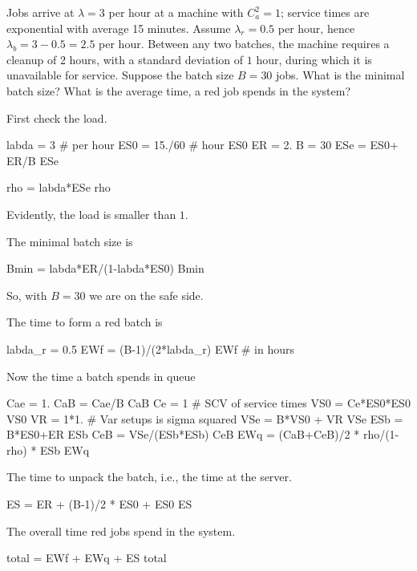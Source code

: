\begin{exercise}[\faPhoto]
  Jobs arrive at $\lambda=3$ per hour at a machine with $C_a^2=1$; service times are exponential with average 15 minutes.  Assume $\lambda_r = 0.5$ per hour, hence $\lambda_b = 3-0.5=2.5$ per hour. Between any two batches, the machine requires a cleanup of 2 hours, with a standard deviation of $1$ hour, during which it is unavailable for service.  Suppose the batch size $B=30$ jobs. What is the minimal batch size?  What is the average time, a red job spends in the system? 
  \begin{solution}
First check the load.
\begin{pyconsole}
labda = 3 # per hour
ES0 = 15./60 # hour
ES0
ER = 2.
B = 30
ESe = ES0+ ER/B
ESe

rho = labda*ESe
rho
\end{pyconsole}
Evidently, the load is smaller than $1$. 

The minimal batch size is
\begin{pyconsole}
Bmin = labda*ER/(1-labda*ES0)
Bmin
\end{pyconsole}
So, with $B=30$ we are on the safe side. 

The time to form a red batch is 
\begin{pyconsole}
labda_r = 0.5
EWf = (B-1)/(2*labda_r)
EWf # in hours
\end{pyconsole}

Now the time a batch spends in queue
\begin{pyconsole}
Cae = 1.
CaB = Cae/B
CaB
Ce = 1 # SCV of service times
VS0 = Ce*ES0*ES0
VS0
VR = 1*1. # Var setups is sigma squared
VSe = B*VS0 + VR
VSe
ESb = B*ES0+ER
ESb
CeB = VSe/(ESb*ESb)
CeB
EWq = (CaB+CeB)/2 * rho/(1-rho) * ESb
EWq
\end{pyconsole}

The time to unpack the batch, i.e., the time at the server. 
\begin{pyconsole}
ES = ER + (B-1)/2 * ES0 + ES0  
ES
\end{pyconsole}


The overall time red jobs spend in the system.
\begin{pyconsole}
total = EWf + EWq + ES
total
\end{pyconsole}

  \end{solution}
\end{exercise}

